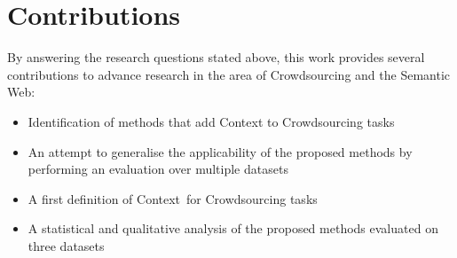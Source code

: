 \section{Contributions}
By answering the research questions stated above, this work provides several contributions to advance research in the area of Crowdsourcing and the Semantic Web:
\begin{itemize}
	\item Identification of methods that add Context to Crowdsourcing tasks
	\item An attempt to generalise the applicability of the proposed methods by performing an evaluation over multiple datasets
	\item A first definition of \guillemotright Context\guillemotleft~for Crowdsourcing tasks 
	\item A statistical and qualitative analysis of the proposed methods evaluated on three datasets
\end{itemize}